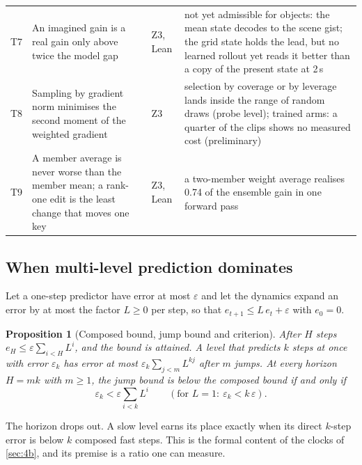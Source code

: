 \documentclass[10pt,twocolumn]{article}
\newtheorem{proposition}{Proposition}
\theoremstyle{remark}
\begin{document}
\begin{table}[!tp]
\begin{tabularx}{\textwidth}{@{}l>{\raggedright\arraybackslash}p{60mm}l>{\raggedright\arraybackslash}X@{}}
T7 & An imagined gain is a real gain only above twice the model gap & Z3, Lean &
not yet admissible for objects: the mean state decodes to the scene gist; the grid state holds the lead, but no learned rollout yet reads it better than a copy of the present state at 2\,s \\
T8 & Sampling by gradient norm minimises the second moment of the weighted gradient & Z3 &
selection by coverage or by leverage lands inside the range of random draws (probe level); trained arms: a quarter of the clips shows no measured cost (preliminary) \\
T9 & A member average is never worse than the member mean; a rank-one edit is the least change that moves one key & Z3, Lean &
a two-member weight average realises 0.74 of the ensemble gain in one forward pass \\
\bottomrule
\end{tabularx}
\end{table}

\subsection{When multi-level prediction dominates}
Let a one-step predictor have error at most $\varepsilon$ and let the dynamics expand an error by at most the factor $L\ge0$ per
step, so that $e_{t+1}\le L\,e_t+\varepsilon$ with $e_0=0$.
\begin{proposition}[Composed bound, jump bound and criterion]\label{prop:jump}
After $H$ steps $e_H\le\varepsilon\sum_{i<H}L^{i}$, and the bound is attained. A level that predicts $k$ steps at once with error
$\varepsilon_k$ has error at most $\varepsilon_k\sum_{j<m}L^{kj}$ after $m$ jumps. At every horizon $H=mk$ with $m\ge1$, the jump bound
is below the composed bound if and only if
\begin{equation}
\varepsilon_k<\varepsilon\sum_{i<k}L^{i}\qquad(\text{for }L=1:\ \varepsilon_k<k\,\varepsilon).\label{eq:jump}
\end{equation}
\end{proposition}
\noindent The horizon drops out. A slow level earns its place exactly when its direct $k$-step error is below $k$ composed fast
steps. This is the formal content of the clocks of \cref{sec:4b}, and its premise is a ratio one can measure.
\end{document}

